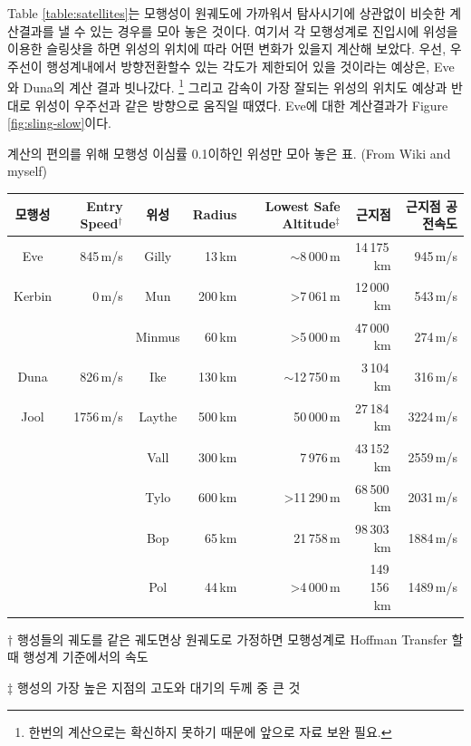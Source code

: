 \documentclass[9pt,twoside,openany]{amsbook}
\begin{document}
Table \ref{table:satellites}는 모행성이 원궤도에 가까워서 탐사시기에 상관없이 비슷한 계산결과를 낼 수 있는 경우를 모아 놓은 것이다. 여기서 각 모행성계로 진입시에 위성을 이용한 슬링샷을 하면 위성의 위치에 따라 어떤 변화가 있을지 계산해 보았다. 우선, 우주선이 행성계내에서 방향전환할수 있는 각도가 제한되어 있을 것이라는 예상은, Eve와 Duna의 계산 결과 빗나갔다. \footnote{한번의 계산으로는 확신하지 못하기 때문에 앞으로 자료 보완 필요.} 그리고 감속이 가장 잘되는 위성의 위치도 예상과 반대로 위성이 우주선과 같은 방향으로 움직일 때였다. Eve에 대한 계산결과가 Figure \ref{fig:sling-slow}이다.
\begin{center}
\begin{adjustbox}{width=\textwidth}
\begin{threeparttable}
\caption{계산의 편의를 위해 모행성 이심률 0.1이하인 위성만 모아 놓은 표. (From Wiki and myself)}
\label{table:satellites}
\begin{tabular}{|c|r|c|r|r|r|r|}
\hline
모행성&\makecell{Entry\\ Speed$^\dagger$}& 위성& Radius& \makecell{Lowest Safe \\Altitude$^\ddagger$}&근지점&근지점 공전속도 
\\\hline
Eve&845\,m/s&Gilly&13\,km&$\sim$8\,000\,m&14\,175\,km&945\,m/s
\\\hline
Kerbin&0\,m/s&Mun&200\,km&>7\,061\,m&12\,000\,km& 543\,m/s
\\&&Minmus&60\,km&>5\,000\,m&47\,000\,km&274\,m/s
\\\hline
Duna&826\,m/s&Ike&130\,km&$\sim$12\,750\,m&3\,104\,km&316\,m/s
\\\hline
Jool&1756\,m/s&Laythe&500\,km&50\,000\,m&27\,184\,km&3224\,m/s
\\&&Vall&300\,km&7\,976\,m&43\,152\,km&2559\,m/s
\\&&Tylo&600\,km&>11\,290\,m&68\,500\,km&2031\,m/s
\\&&Bop&65\,km&21\,758\,m&98\,303\,km&1884\,m/s
\\&&Pol&44\,km&>4\,000\,m&149\,156\,km&1489\,m/s
\\\hline
\end{tabular}
\begin{tablenotes}
\item[$\dagger$] 행성들의 궤도를 같은 궤도면상 원궤도로 가정하면 모행성계로 Hoffman Transfer 할 때 행성계 기준에서의 속도
\item[$\ddagger$] 행성의 가장 높은 지점의 고도와 대기의 두께 중 큰 것
\end{tablenotes}
\end{threeparttable}
\end{adjustbox}
\end{center}
\end{document}
